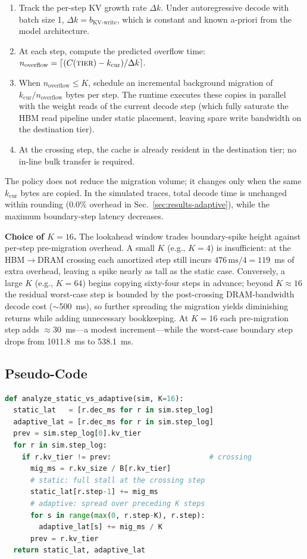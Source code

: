 \documentclass[conference]{IEEEtran}
\begin{document}
\begin{enumerate}
\item Track the per-step KV growth rate $\Delta k$. Under autoregressive decode with batch size 1, $\Delta k = b_{\text{KV-write}}$, which is constant and known a-priori from the model architecture.
\item At each step, compute the predicted overflow time:
\(
n_{\text{overflow}} = \lceil (C(\textsc{tier}) - k_{\text{cur}}) / \Delta k \rceil.
\)
\item When $n_{\text{overflow}} \leq K$, schedule an incremental background migration of $k_{\text{cur}} / n_{\text{overflow}}$ bytes per step. The runtime executes these copies in parallel with the weight reads of the current decode step (which fully saturate the HBM read pipeline under static placement, leaving spare write bandwidth on the destination tier).
\item At the crossing step, the cache is already resident in the destination tier; no in-line bulk transfer is required.
\end{enumerate}

The policy does not reduce the migration volume; it changes only when the same $k_{\text{cur}}$ bytes are copied. In the simulated traces, total decode time is unchanged within rounding (0.0\% overhead in Sec.~\ref{sec:results-adaptive}), while the maximum boundary-step latency decreases.

\textbf{Choice of \boldmath$K=16$.} The lookahead window trades boundary-spike height against per-step pre-migration overhead. A small $K$ (e.g., $K=4$) is insufficient: at the HBM$\rightarrow$DRAM crossing each amortized step still incurs $476\,\text{ms}/4 = 119$~ms of extra overhead, leaving a spike nearly as tall as the static case. Conversely, a large $K$ (e.g., $K=64$) begins copying sixty-four steps in advance; beyond $K\approx16$ the residual worst-case step is bounded by the post-crossing DRAM-bandwidth decode cost ($\sim$500~ms), so further spreading the migration yields diminishing returns while adding unnecessary bookkeeping. At $K=16$ each pre-migration step adds $\approx$30~ms---a modest increment---while the worst-case boundary step drops from 1011.8~ms to 538.1~ms.

\subsection{Pseudo-Code}

\begin{lstlisting}[language=Python]
def analyze_static_vs_adaptive(sim, K=16):
  static_lat   = [r.dec_ms for r in sim.step_log]
  adaptive_lat = [r.dec_ms for r in sim.step_log]
  prev = sim.step_log[0].kv_tier
  for r in sim.step_log:
    if r.kv_tier != prev:                       # crossing
      mig_ms = r.kv_size / B[r.kv_tier]
      # static: full stall at the crossing step
      static_lat[r.step-1] += mig_ms
      # adaptive: spread over preceding K steps
      for s in range(max(0, r.step-K), r.step):
        adaptive_lat[s] += mig_ms / K
      prev = r.kv_tier
  return static_lat, adaptive_lat
\end{lstlisting}
\end{document}
